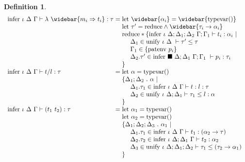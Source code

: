 \documentclass[manuscript]{acmart}
\theoremstyle{definition}
\newtheorem{definition}{Definition}[section]
\begin{document}
\begin{definition}
\[\begin{array}{l @{} l}
    \text{infer } \iota\ \Delta\ \Gamma \vdash 
    \lambda\ \widebar{m_i \Rightarrow t_i} : \tau
    &{} =
    \begin{array}[t]{@{} l}
      \text{let } \widebar{\alpha_i} = \widebar{\text{typevar}()}
      \\
      \text{let } \tau' = \text{reduce} \wedge 
      \widebar{\tau_i \rightarrow \alpha_i }
      \\
      \text{reduce} * \{
      \text{infer } \iota\ \Delta;\Delta_1;\Delta_2\ \Gamma;\Gamma_1 \vdash t_i : \alpha_i\ |\ 
      \\
      \ \ \ \ \Delta_1 \in \text{unify } \iota\ \Delta\ \vdash \tau' \leq \tau
      \\
      \ \ \ \ \Gamma_1 \in \{\text{patenv } p_i\}
      \\
      \ \ \ \ \Delta_2.\tau' \in \text{infer } \blacksquare\ \Delta;\Delta_1\ \Gamma;\Gamma_1\ \vdash p_i : \tau_i
      \\
      \}
      \\
    \end{array}
    \\

    \text{infer } \iota\ \Delta\ \Gamma \vdash 
    t/l : \tau
    &{} =
    \begin{array}[t]{@{} l}
      \text{let } \alpha = \text{typevar}()
      \\
      \{ \Delta_1;\Delta_2\ .\ \alpha \ |\
      \\
      \ \ \ \ \Delta_1.\tau_1 \in \text{infer } \iota\ \Delta\ \Gamma \vdash t : l : \tau 
      \\
      \ \ \ \ \Delta_2 \in \text{unify } \iota\ \Delta;\Delta_1 \vdash \tau_1 \leq l : \alpha
      \\
      \}
    \end{array}
    \\

    \text{infer } \iota\ \Delta\ \Gamma \vdash 
    (t_1\ t_2) : \tau
    &{} =
    \begin{array}[t]{@{} l}
      \text{let } \alpha_1 = \text{typevar}()
      \\
      \text{let } \alpha_2 = \text{typevar}()
      \\
      \{ \Delta_1;\Delta_2;\Delta_3\ .\ \alpha_1 \ |\
      \\
      \ \ \ \ \Delta_1.\tau_1 \in \text{infer } \iota\ \Delta\ \Gamma \vdash t_1 : (\alpha_2 \rightarrow \tau) 
      \\
      \ \ \ \ \Delta_2.\tau_2 \in \text{infer } \iota\ \Delta;\Delta_1\ \Gamma \vdash t_2 : \alpha_2
      \\
      \ \ \ \ \Delta_3 \in \text{unify } \iota\ \Delta;\Delta_1;\Delta_2 \vdash 
      \tau_1 \leq (\tau_2 \rightarrow \alpha_1)
      \\
      \}
    \end{array}
    \\


\end{array}\]
\end{definition}
\end{document}
